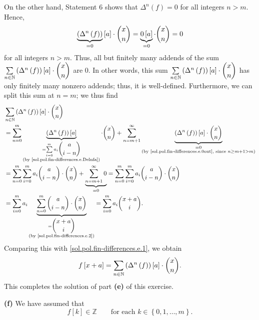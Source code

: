 \documentclass[paper=a4, fontsize=12pt]{scrartcl}%
\let\sumnonlimits\sum
\renewcommand{\sum}{\sumnonlimits\limits}
\theoremstyle{plainsl}
\theoremstyle{definition}
\theoremstyle{remark}
\begin{document}
On the other hand, Statement 6 shows that $\Delta^{n}\left(  f\right)  =0$ for
all integers $n>m$. Hence,
\begin{equation}
\underbrace{\left(  \Delta^{n}\left(  f\right)  \right)  }_{=0}\left[
a\right]  \cdot\dbinom{x}{n}=\underbrace{0\left[  a\right]  }_{=0}\cdot
\dbinom{x}{n}=0 \label{sol.pol.fin-differences.e.0out}%
\end{equation}
for all integers $n>m$. Thus, all but finitely many addends of the sum
$\sum_{n\in\mathbb{N}}\left(  \Delta^{n}\left(  f\right)  \right)  \left[
a\right]  \cdot\dbinom{x}{n}$ are $0$. In other words, this sum $\sum
_{n\in\mathbb{N}}\left(  \Delta^{n}\left(  f\right)  \right)  \left[
a\right]  \cdot\dbinom{x}{n}$ has only finitely many nonzero addends; thus, it
is well-defined. Furthermore, we can split this sum at $n=m$; we thus find%
\begin{align*}
&  \sum_{n\in\mathbb{N}}\left(  \Delta^{n}\left(  f\right)  \right)  \left[
a\right]  \cdot\dbinom{x}{n}\\
&  =\sum_{n=0}^{m}\underbrace{\left(  \Delta^{n}\left(  f\right)  \right)
\left[  a\right]  }_{\substack{=\sum_{i=0}^{m}a_{i}\dbinom{a}{i-n}\\\text{(by
\eqref{sol.pol.fin-differences.e.Delnfa})}}}\cdot\dbinom{x}{n}+\sum
_{n=m+1}^{\infty}\underbrace{\left(  \Delta^{n}\left(  f\right)  \right)
\left[  a\right]  \cdot\dbinom{x}{n}}_{\substack{=0\\\text{(by
\eqref{sol.pol.fin-differences.e.0out}, since }n\geq m+1>m\text{)}}}\\
&  =\sum_{n=0}^{m}\sum_{i=0}^{m}a_{i}\dbinom{a}{i-n}\cdot\dbinom{x}%
{n}+\underbrace{\sum_{n=m+1}^{\infty}0}_{=0}=\sum_{n=0}^{m}\sum_{i=0}^{m}%
a_{i}\dbinom{a}{i-n}\cdot\dbinom{x}{n}\\
&  =\sum_{i=0}^{m}a_{i}\underbrace{\sum_{n=0}^{m}\dbinom{a}{i-n}\cdot
\dbinom{x}{n}}_{\substack{=\dbinom{x+a}{i}\\\text{(by
\eqref{sol.pol.fin-differences.e.2})}}}=\sum_{i=0}^{m}a_{i}\dbinom{x+a}{i}.
\end{align*}
Comparing this with \eqref{sol.pol.fin-differences.e.1}, we obtain%
\[
f\left[  x+a\right]  =\sum_{n\in\mathbb{N}}\left(  \Delta^{n}\left(  f\right)
\right)  \left[  a\right]  \cdot\dbinom{x}{n}.
\]
This completes the solution of part \textbf{(e)} of this exercise.

\bigskip

\textbf{(f)} We have assumed that%
\begin{equation}
f\left[  k\right]  \in\mathbb{Z}\qquad\text{for each }k\in\left\{
0,1,\ldots,m\right\}  . \label{sol.pol.fin-differences.f.ass}%
\end{equation}
\end{document}

